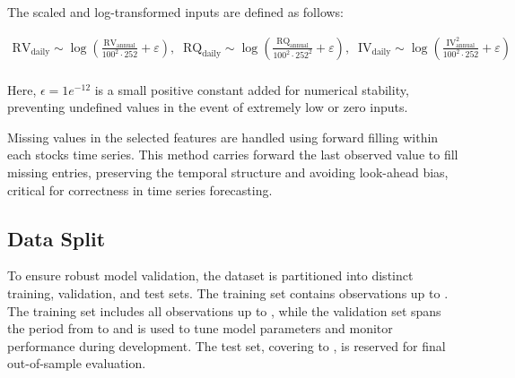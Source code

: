 The scaled and log-transformed inputs are defined as follows: 


\begin{equation*}
    \begin{gathered}
  \text{RV}_{\text{daily}} \sim  \log\left( \frac{\text{RV}_{\text{annual}}}{100^2 \cdot 252} + \varepsilon \right), \; \;
  \text{RQ}_{\text{daily}} \sim \log\left( \frac{\text{RQ}_{\text{annual}}}{100^2 \cdot 252^2} + \varepsilon \right), \; \;
    \text{IV}_{\text{daily}} \sim \log\left( \frac{\text{IV}_{\text{annual}}^2}{100^2 \cdot 252} + \varepsilon \right) \\
    \end{gathered}
\end{equation*}

Here, $\epsilon = 1e^{-12}$ is a small positive constant added for numerical stability, preventing undefined values in the event of extremely low or zero inputs.

Missing values in the selected features are handled using forward filling within each stocks time series. This method carries forward the last observed value to fill missing entries, preserving the temporal structure and avoiding look-ahead bias, critical for correctness in time series forecasting.

\subsection{Data Split}
\label{sec:data_preprocessing}
To ensure robust model validation, the dataset is partitioned into distinct training, validation, and test sets. The training set contains observations up to \trainSetEnd. The training set includes all observations up to \trainSetEnd, while the validation set spans the period from \trainSetEnd to \validationSetEnd and is used to tune model parameters and monitor performance during development. The test set, covering \validationSetEnd to \testSetEnd, is reserved for final out-of-sample evaluation. 

